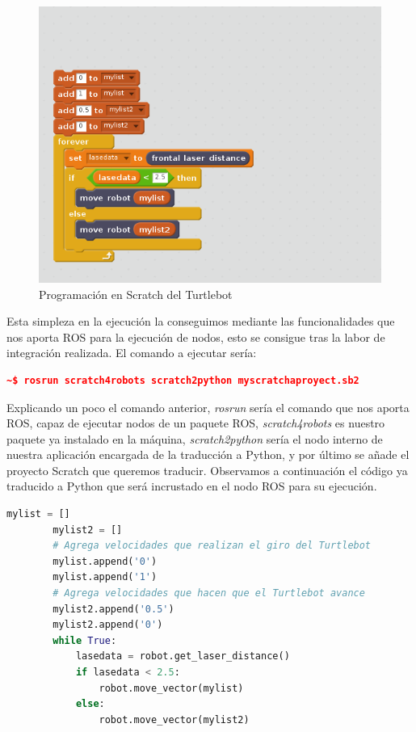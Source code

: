\begin{figure}[H]
    \centering
    \includegraphics[scale=0.60]{img/robot-obstaculos-scratch.PNG}
  	\caption{Programación en Scratch del Turtlebot}
  	\label{fig:turtlebot}
\end{figure}

Esta simpleza en la ejecución la conseguimos mediante las funcionalidades que nos aporta ROS para la ejecución de nodos, esto se consigue tras la labor de integración realizada. El comando a ejecutar sería:
\pagebreak

\begin{lstlisting}[language=json,firstnumber=1]
~$ rosrun scratch4robots scratch2python myscratchaproyect.sb2
\end{lstlisting}


Explicando un poco el comando anterior, \textit{rosrun} sería el comando que nos aporta ROS, capaz de ejecutar nodos de un paquete ROS, \textit{scratch4robots} es nuestro paquete ya instalado en la máquina, \textit{scratch2python} sería el nodo interno de nuestra aplicación encargada de la traducción a Python, y por último se añade el proyecto Scratch que queremos traducir. Observamos a continuación el código ya traducido a Python que será incrustado en el nodo ROS para su ejecución.

\begin{lstlisting}[language=python,firstnumber=1]
        mylist = []
        mylist2 = []
		# Agrega velocidades que realizan el giro del Turtlebot
        mylist.append('0')
        mylist.append('1')
        # Agrega velocidades que hacen que el Turtlebot avance
        mylist2.append('0.5')
        mylist2.append('0')
        while True:
            lasedata = robot.get_laser_distance()
            if lasedata < 2.5:
                robot.move_vector(mylist)
            else:
                robot.move_vector(mylist2)
                
\end{lstlisting}

